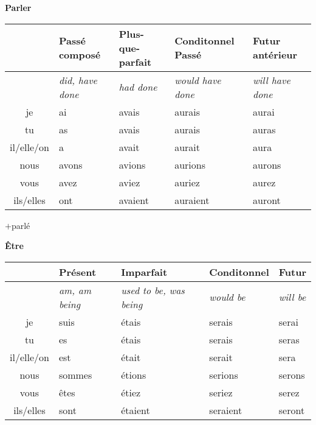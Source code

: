 \begin{flushleft}
\textbf{Parler}
\vskip 0.1cm
\begin{tabular}{|c||L{2.5cm}|L{2.5cm}|L{2.5cm}|L{2.5cm}|}
\hline
& Pass\'e compos\'e & Plus-que-parfait & Conditonnel Pass\'e & Futur ant\'erieur \\
\hline
& \textit{did, have done} & \textit{had done} & \textit{would have done} & \textit{will have done} \\
\hline\hline
je            &	ai	&	avais	&	aurais	 &	aurai	\\
tu            &	as 	&	avais	&	aurais	&	auras	\\
il/elle/on  &	a	&	avait	&	aurait	&	aura	\\
nous       &	avons	&	avions	&	aurions	&	aurons	\\
vous       &	avez	&	aviez	&	auriez		&	aurez	\\
ils/elles   &	ont 	&	avaient	&	auraient	&	auront	\\
\hline
\end{tabular}
\quad$+$\quad parl\'e
\end{flushleft}

\clearpage
\begin{flushleft}
\textbf{\^Etre}
\vskip 0.1cm
\begin{tabular}{|c||L{2.5cm}|L{2.5cm}|L{2.5cm}|L{2.5cm}|}
\hline
& Pr\'esent & Imparfait & Conditonnel & Futur \\
\hline
& \textit{am, am being} & \textit{used to be, was being} & \textit{would be} & \textit{will be} \\
\hline\hline
je            &	suis	&	\'etais	&	serais	 &	serai	\\
tu            &	es 	&	\'etais	&	serais	&	seras	\\
il/elle/on  &	est	&	\'etait	&	serait	&	sera	\\
nous       &	sommes	&	\'etions	&	serions	&	serons	\\
vous       &	\^etes	&	\'etiez	&	seriez		&	serez	\\
ils/elles   &	sont 	&	\'etaient	&	seraient	&	seront	\\
\hline
\end{tabular}
\end{flushleft}

